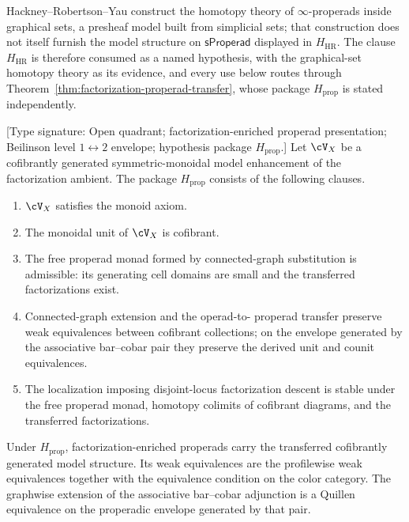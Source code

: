 \begin{remark}
\label{rem:hackney-robertson-scope}
Hackney--Robertson--Yau \cite{HRY17} construct the homotopy theory of
$\infty$-properads inside graphical sets, a presheaf model built from
simplicial sets; that construction does not itself furnish the model
structure on $\mathsf{sProperad}$ displayed in $H_{\mathrm{HR}}$.
The clause $H_{\mathrm{HR}}$ is therefore consumed as a named
hypothesis, with the graphical-set homotopy theory as its evidence,
and every use below routes through
Theorem~\ref{thm:factorization-properad-transfer}, whose package
$H_{\mathrm{prop}}$ is stated independently.
\end{remark}

\begin{theorem}
\label{thm:factorization-properad-transfer}
\textup{[Type signature: Open quadrant; factorization-enriched
properad presentation; Beilinson level $1\leftrightarrow2$ envelope;
hypothesis package $H_{\mathrm{prop}}$.]}
Let $\cV_X$ be a cofibrantly generated symmetric-monoidal model
enhancement of the factorization ambient.  The package
$H_{\mathrm{prop}}$ consists of the following clauses.
\begin{enumerate}[label=\textup{(P\arabic*)}]
\item \label{Hprop-monoid} $\cV_X$ satisfies the monoid axiom.
\item \label{Hprop-unit} The monoidal unit of $\cV_X$ is cofibrant.
\item \label{Hprop-admissible} The free properad monad formed by
connected-graph substitution is admissible: its generating cell
domains are small and the transferred factorizations exist.
\item \label{Hprop-weq} Connected-graph extension and the operad-to-
properad transfer preserve weak equivalences between cofibrant
collections; on the envelope generated by the associative bar--cobar
pair they preserve the derived unit and counit equivalences.
\item \label{Hprop-descent} The localization imposing disjoint-locus
factorization descent is stable under the free properad monad,
homotopy colimits of cofibrant diagrams, and the transferred
factorizations.
\end{enumerate}
Under $H_{\mathrm{prop}}$, factorization-enriched properads carry the
transferred cofibrantly generated model structure.  Its weak
equivalences are the profilewise weak equivalences together with the
equivalence condition on the color category.  The graphwise extension
of the associative bar--cobar adjunction is a Quillen equivalence on
the properadic envelope generated by that pair.
\end{theorem}

